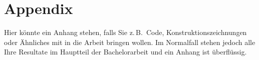 \chapter{Appendix} 

Hier könnte ein Anhang stehen, falls Sie z.\,B.\ Code, Konstruktionszeichnungen oder Ähnliches mit in die Arbeit bringen wollen.
Im Normalfall stehen jedoch alle Ihre Resultate im Hauptteil der Bachelorarbeit und ein Anhang ist überflüssig.
